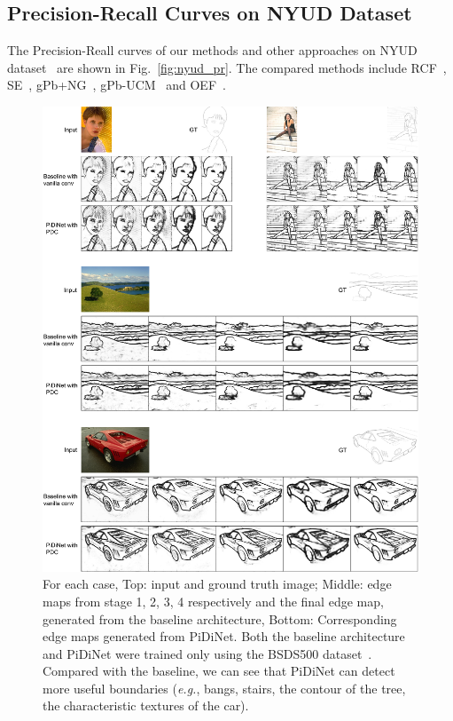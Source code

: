 \documentclass[10pt,twocolumn,letterpaper]{article}
\begin{document}
\subsection{Precision-Recall Curves on NYUD Dataset}

The Precision-Reall curves of our methods and other approaches on NYUD dataset~\cite{shi2000nyud} are shown in Fig.~\ref{fig:nyud_pr}. The compared methods include RCF~\cite{liu2019richer}, SE~\cite{dollar2014se}, gPb+NG~\cite{gupta2013gpbng}, gPb-UCM~\cite{arbelaez2010bsds} and OEF~\cite{hallman2015oef}.

\begin{figure}[t!]
    \centering
    \includegraphics[width=0.97\linewidth]{images/supplement_fig1_cap.pdf}
    \caption{For each case, Top: input and ground truth image; Middle: edge maps from stage 1, 2, 3, 4 respectively and the final edge map, generated from the baseline architecture, Bottom: Corresponding edge maps generated from PiDiNet. Both the baseline architecture and PiDiNet were trained only using the BSDS500 dataset~\cite{arbelaez2010bsds}. Compared with the baseline, we can see that PiDiNet can detect more useful boundaries (\emph{e.g.}, bangs, stairs, the contour of the tree, the characteristic textures of the car).}
    \label{fig:stages}
\end{figure}
\end{document}
